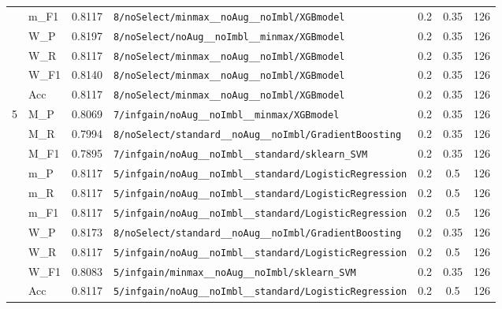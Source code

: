 \begin{table}[htbp]
\begin{tabular}{|c|l|c|>{\ttfamily\footnotesize}p{7.2cm}|c|c|c|}
 & m\_F1 & 0.8117 & \texttt{8/noSelect/minmax\_\_noAug\_\_noImbl/XGBmodel} & 0.2 & 0.35  & 126 \\ 
 & W\_P & 0.8197 & \texttt{8/noSelect/noAug\_\_noImbl\_\_minmax/XGBmodel} & 0.2 & 0.35  & 126 \\ 
 & W\_R & 0.8117 & \texttt{8/noSelect/minmax\_\_noAug\_\_noImbl/XGBmodel} & 0.2 & 0.35  & 126 \\ 
 & W\_F1 & 0.8140 & \texttt{8/noSelect/minmax\_\_noAug\_\_noImbl/XGBmodel} & 0.2 & 0.35  & 126 \\ 
 & Acc & 0.8117 & \texttt{8/noSelect/minmax\_\_noAug\_\_noImbl/XGBmodel} & 0.2 & 0.35  & 126 \\ 
\hline
\multirow{10}{*}{5} & M\_P & 0.8069 & \texttt{7/infgain/noAug\_\_noImbl\_\_minmax/XGBmodel} & 0.2 & 0.35  & 126 \\ 
 & M\_R & 0.7994 & \texttt{8/noSelect/standard\_\_noAug\_\_noImbl/GradientBoosting} & 0.2 & 0.35  & 126 \\ 
 & M\_F1 & 0.7895 & \texttt{7/infgain/noAug\_\_noImbl\_\_standard/sklearn\_SVM} & 0.2 & 0.35  & 126 \\ 
 & m\_P & 0.8117 & \texttt{5/infgain/noAug\_\_noImbl\_\_standard/LogisticRegression} & 0.2 & 0.5  & 126 \\ 
 & m\_R & 0.8117 & \texttt{5/infgain/noAug\_\_noImbl\_\_standard/LogisticRegression} & 0.2 & 0.5  & 126 \\ 
 & m\_F1 & 0.8117 & \texttt{5/infgain/noAug\_\_noImbl\_\_standard/LogisticRegression} & 0.2 & 0.5  & 126 \\ 
 & W\_P & 0.8173 & \texttt{8/noSelect/standard\_\_noAug\_\_noImbl/GradientBoosting} & 0.2 & 0.35  & 126 \\ 
 & W\_R & 0.8117 & \texttt{5/infgain/noAug\_\_noImbl\_\_standard/LogisticRegression} & 0.2 & 0.5  & 126 \\ 
 & W\_F1 & 0.8083 & \texttt{5/infgain/minmax\_\_noAug\_\_noImbl/sklearn\_SVM} & 0.2 & 0.35  & 126 \\ 
 & Acc & 0.8117 & \texttt{5/infgain/noAug\_\_noImbl\_\_standard/LogisticRegression} & 0.2 & 0.5  & 126 \\ 
\hline
\end{tabular}
\end{table}